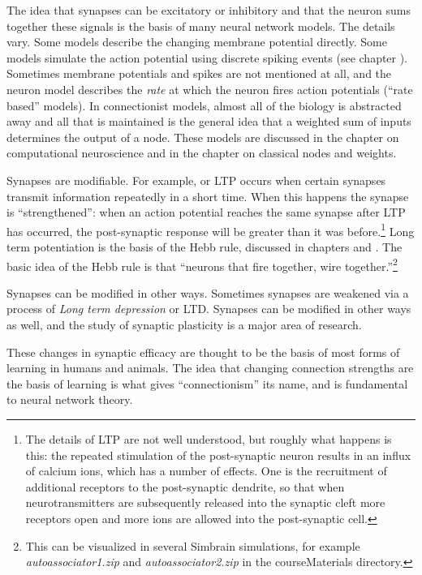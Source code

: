 The idea that synapses can be excitatory or inhibitory and that the neuron sums together these signals is the basis of many neural network models. The details vary. Some models describe the changing membrane potential directly. Some models simulate the action potential using discrete spiking events (see chapter ). Sometimes membrane potentials and spikes are not mentioned at all, and the neuron model describes the \emph{rate} at which the neuron fires action potentials (``rate based'' models). In connectionist models, almost all of the biology is abstracted away and all that is maintained is the general idea that a weighted sum of inputs determines the output of a node. These models are discussed in the chapter on computational neuroscience and in the chapter on classical nodes and weights.

Synapses are modifiable. For example,   or LTP occurs when certain synapses transmit information repeatedly in a short time. When this happens the synapse is ``strengthened'': when an action potential reaches the same synapse after LTP has occurred, the post-synaptic response will be greater than it was before.\footnote{The details of LTP are not well understood, but roughly what happens is this: the repeated stimulation of the post-synaptic neuron results in an influx of calcium ions, which has a number of effects. One is the recruitment of additional receptors to the post-synaptic dendrite, so that when neurotransmitters are subsequently released into the synaptic cleft more receptors open and more ions are allowed into the post-synaptic cell.}   Long term potentiation is the basis of the Hebb rule, discussed in chapters  and . The basic idea of the Hebb rule is that ``neurons that fire together, wire together.''\footnote{This can be visualized in several Simbrain simulations, for example \emph{autoassociator1.zip} and \emph{autoassociator2.zip} in the courseMaterials directory.}   

Synapses can be modified in other ways. Sometimes synapses are weakened via a process of \emph{Long term depression} or LTD. Synapses can be modified in other ways as well, and the study of synaptic plasticity is a major area of research.

These changes in synaptic efficacy are thought to be the basis of most forms of learning in humans and animals. The idea that changing connection strengths are the basis of learning is what gives ``connectionism'' its name, and is fundamental to neural network theory.

